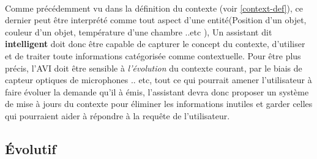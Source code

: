 \paragraph{}
Comme précédemment vu dans la définition du contexte (voir \ref{context-def}), ce dernier peut être interprété comme tout aspect d'une entité(Position d'un objet, couleur d'un objet, température d'une chambre ..etc ), Un assistant dit \textbf{intelligent} doit donc être capable de capturer le concept du contexte, d'utiliser et de traiter toute informations catégorisée comme contextuelle.
Pour être plus précis, l'AVI doit être sensible à \textit{l'évolution} du contexte courant, par le biais de capteur optiques de microphones .. etc, tout ce qui pourrait amener l'utilisateur à faire évoluer la demande qu'il à émis, l'assistant devra donc proposer un système de mise à jours du contexte pour éliminer les informations inutiles et garder celles qui pourraient aider à répondre à la requête de l'utilisateur.
\subsection{Évolutif}
